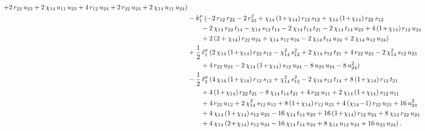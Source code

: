 \documentclass[aps,prd,preprint,groupedaddress,nofootinbib,showpacs,eqsecnum]{revtex4}
\begin{document}
\begin{equation}
\begin{aligned}
+2\,r_{22}\,u_{23}
+2\,\chi_{14}\,u_{11}\,u_{23}
+4\,r_{12}\,u_{24}+2\,r_{22}\,u_{24}
+2\,\chi_{14}\,u_{11}\,u_{24})
\\ &
-k_{1}^\mu\,(-2\,r_{12}\,r_{22}-2\,r_{22}^{2}
+\chi_{14}\,(1\!+\!\chi_{14})\,r_{12}\,s_{12}
+\chi_{14}\,(1\!+\!\chi_{14})\,r_{22}\,s_{12}
\\ &\hspace*{7mm}
-2\,\chi_{14}\,r_{22}\,t_{14}-\chi_{14}\,s_{12}\,t_{14}
-2\,\chi_{14}\,t_{14}\,t_{21}
-2\,\chi_{14}\,t_{14}\,u_{23}
+4\,(1\!+\!\chi_{14})\,r_{12}\,u_{24}
\\ &\hspace*{7mm}
+2\,(2+\chi_{14})\,r_{22}\,u_{24}
+\chi_{14}\,s_{12}\,u_{24}-2\,\chi_{14}\,t_{14}\,u_{24}
+2\,\chi_{14}\,u_{12}\,u_{24})
\\ &
+\frac{1}{2}\,\ell_1^\mu\,(2\,\chi_{14}\,(1\!+\!\chi_{14})\,r_{22}\,s_{12}
-\chi_{14}^{2}\,s_{12}^{2}
+2\,\chi_{14}\,s_{12}\,t_{21}
+4\,r_{22}\,u_{23}-2\,\chi_{14}^{2}\,s_{12}\,u_{23}
\\ &\hspace*{7mm}
+4\,r_{22}\,u_{24}
-2\,\chi_{14}\,(1\!+\!\chi_{14})\,s_{12}\,u_{24}
-8\,u_{23}\,u_{24}-8\,u_{24}^{2})
\\ &
-\frac{1}{2}\,\ell_2^\mu\,(4\,\chi_{14}\,(1\!+\!\chi_{14})\,r_{12}\,s_{12}
+\chi_{14}^{2}\,s_{12}^{2}-2\,\chi_{14}\,s_{12}\,t_{14}
+8\,(1\!+\!\chi_{14})\,r_{12}\,t_{21}
\\ &\hspace*{7mm}
+4\,(1\!+\!\chi_{14})\,r_{22}\,t_{21}
-8\,\chi_{14}\,t_{14}\,t_{21}+4\,r_{22}\,u_{11}
+2\,\chi_{14}\,(1\!+\!\chi_{14})\,s_{12}\,u_{11}
\\ &\hspace*{7mm}
+4\,r_{22}\,u_{12}
+2\,\chi_{14}^{2}\,s_{12}\,u_{12}
+8\,(1\!+\!\chi_{14})\,r_{12}\,u_{23}
+4\,(\chi_{14}\!-\!1)\,r_{22}\,u_{23}
+16\,u_{24}^{2}
\\ &\hspace*{7mm}
+4\,\chi_{14}\,(1\!+\!\chi_{14})\,s_{12}\,u_{23}
-16\,\chi_{14}\,t_{14}\,u_{23}
+16\,(1\!+\!\chi_{14})\,r_{12}\,u_{24}
+8\,\chi_{14}\,r_{22}\,u_{24}
\\ &\hspace*{7mm}
+4\,\chi_{14}\,(2\!+\!\chi_{14})\,s_{12}\,u_{24}
-16\,\chi_{14}\,t_{14}\,u_{24}
+8\,\chi_{14}\,u_{12}\,u_{24}+16\,u_{23}\,u_{24})
\,.\\
%
\end{aligned}
\label{MasslessDoubleBoxVector3}
\end{equation}
\end{document}
